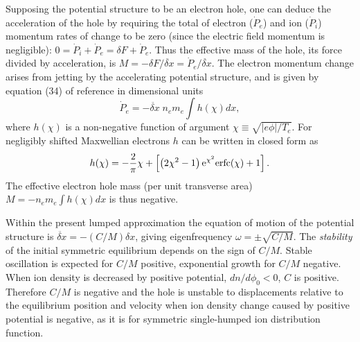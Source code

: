 \documentclass[12pt]{article}
\begin{document}
Supposing the potential structure to be an electron hole, one can
deduce the acceleration of the hole by requiring the total of electron
($\dot P_e$) and ion ($\dot P_i$) momentum rates of change to be zero
(since the electric field momentum is negligible):
$0=\dot P_i+\dot P_e=\delta F +\dot P_e$. Thus the effective mass of
the hole, its force divided by acceleration, is
$M=-\delta F/\ddot{\delta x}=\dot P_e/\ddot{\delta x}$. The electron
momentum change arises from jetting by the accelerating potential
structure, and is given by equation (34) of reference \cite{Hutchinson2016}
in dimensional units
\begin{equation}
  \dot P_e = - \ddot{\delta x}\;n_e m_e\int h(\chi) dx ,
\end{equation}
where $h(\chi)$ is a non-negative function of argument
$\chi\equiv\sqrt{|e\phi|/T_e}$. For negligibly shifted Maxwellian
electrons $h$ can be written in closed form as
\begin{equation}
  h(\chi)=-{2\over \pi}\chi +\left[\left(2\chi^2-1\right){\rm e}^{\chi^2}{\rm
      erfc}(\chi)+1  \right].
\end{equation}
The effective electron hole mass (per unit transverse area)
$M=- n_em_e \int h(\chi) dx$ is thus negative.

Within the present lumped approximation the equation of motion of the
potential structure is $\ddot{\delta x}=-(C/M)\delta x$, giving
eigenfrequency $\omega =\pm\sqrt{C/M}$. The \emph{stability} of the
initial symmetric equilibrium depends on the sign of $C/M$.  Stable
oscillation is expected for $C/M$ positive, exponential growth for
$C/M$ negative.  When ion density is decreased by positive
potential, $dn/d\phi_0<0$, $C$ is positive.  Therefore $C/M$ is negative
and the hole is unstable to displacements relative to the equilibrium
position and velocity when ion density change caused by positive
potential is negative, as it is for symmetric single-humped ion
distribution function.
\end{document}
